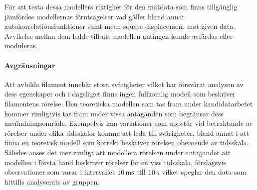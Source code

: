 För att testa dessa modellers riktighet för den mätdata som finns tillgänglig jämfördes modellernas förutsägelser vad gäller bland annat autokorrelationsfunktioner samt mean square displacement mot given data. Avvikelse mellan dem ledde till att modellen antingen kunde avfärdas eller moduleras.


\paragraph{Avgränsningar}
Att avbilda filament innebär stora svårigheter vilket har försvårat analysen av dess egenskaper och i dagsläget finns ingen fullkomlig modell som beskriver filamentens rörelse. Den teoretiska modellen som tas fram under kandidatarbetet kommer rimligtvis tas fram under vissa antaganden som begränsar dess användningsområde. Exempelvis kan variationer som uppstår vid betraktande av rörelser under olika tidsskalor komma att leda till svårigheter, bland annat i att finna en teoretisk modell som korrekt beskriver rörelsen oberoende av tidsskala. Således anses det mer rimligt att modellera rörelsen under antagandet att modellen i första hand beskriver rörelser för en viss tidsskala, förslagsvis observationer som varar i intervallet $\unit[10]{ms}$ till $\unit[10]{s}$ vilket speglar den data som hittills analyserats av gruppen.




